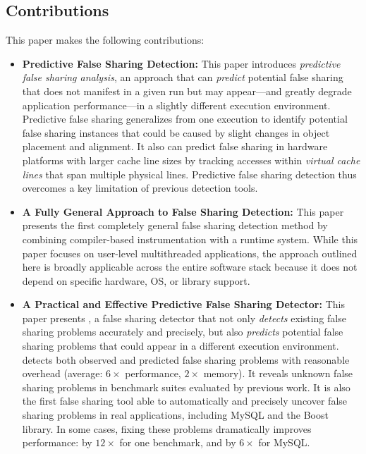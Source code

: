 \subsection*{Contributions}

This paper makes the following contributions:

\begin{itemize}


\item
\textbf{Predictive False Sharing Detection:} This paper introduces \emph{predictive false sharing analysis}, an approach that can \emph{predict} potential false sharing that does not manifest in a given run but may appear---and greatly degrade application performance---in a slightly different execution environment. 
Predictive false sharing generalizes from one execution to identify potential false sharing instances that could be caused by slight changes in object placement and alignment.
It also can predict false sharing in hardware platforms with larger cache line sizes by tracking accesses within \emph{virtual cache lines} that span multiple physical lines. Predictive false sharing detection thus overcomes a key limitation of previous detection tools.

\item
\textbf{A Fully General Approach to False Sharing Detection:} This paper presents the first completely general false sharing detection method by combining compiler-based instrumentation with a runtime system. While this
paper focuses on user-level multithreaded applications, the approach outlined here is broadly applicable across the entire software stack because it does not depend on specific hardware, OS, or library support.

\item
\textbf{A Practical and Effective Predictive False Sharing Detector:} 
This paper presents \Predator{}, a false sharing detector that not only \emph{detects} existing false sharing problems accurately and precisely, but also \emph{predicts} potential false sharing problems that could appear in a different execution environment.
\Predator{} detects both observed and predicted false sharing 
problems with reasonable overhead (average: $6\times$ performance, $2\times$ memory).  It reveals unknown false sharing problems in benchmark suites evaluated by previous work. It is also the first false sharing tool able to automatically and precisely uncover
false sharing problems in real applications, including 
MySQL and the Boost library. In some cases, fixing these problems 
dramatically improves performance: by $12\times$ for one benchmark, and by $6\times$ for MySQL.


\end{itemize}

